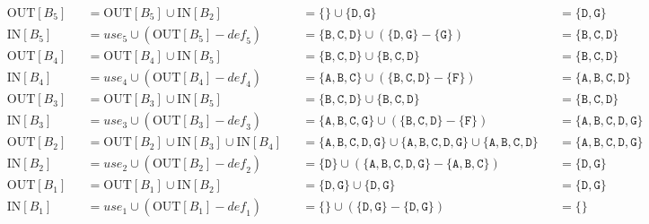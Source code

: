 \documentclass{article}
\begin{document}
\begin{align*}
    & \text{OUT}[B_5] &&= \text{OUT}[B_5] \cup \text{IN}[B_2]    &&= \{  \} \cup \{\texttt{D},\texttt{G}\} &&= \{\texttt{D},\texttt{G}\} \\
    & \text{IN}[B_5]  &&= \textit{use}_5 \cup ( \text{OUT}[B_5] - \textit{def}_5 ) &&= \{\texttt{B},\texttt{C},\texttt{D}\} \cup ( \{\texttt{D},\texttt{G}\} - \{\texttt{G}\} ) &&= \{\texttt{B},\texttt{C},\texttt{D}\} \\
    & \text{OUT}[B_4] &&= \text{OUT}[B_4] \cup \text{IN}[B_5]    &&= \{\texttt{B},\texttt{C},\texttt{D}\} \cup \{\texttt{B},\texttt{C},\texttt{D}\} &&= \{\texttt{B},\texttt{C},\texttt{D}\} \\
    & \text{IN}[B_4]  &&= \textit{use}_4 \cup ( \text{OUT}[B_4] - \textit{def}_4 ) &&= \{\texttt{A},\texttt{B},\texttt{C}\} \cup ( \{\texttt{B},\texttt{C},\texttt{D}\} - \{\texttt{F}\} ) &&= \{\texttt{A},\texttt{B},\texttt{C},\texttt{D}\} \\
    & \text{OUT}[B_3] &&= \text{OUT}[B_3] \cup \text{IN}[B_5]    &&= \{\texttt{B},\texttt{C},\texttt{D}\} \cup \{\texttt{B},\texttt{C},\texttt{D}\} &&= \{\texttt{B},\texttt{C},\texttt{D}\} \\
    & \text{IN}[B_3]  &&= \textit{use}_3 \cup ( \text{OUT}[B_3] - \textit{def}_3 ) &&= \{\texttt{A},\texttt{B},\texttt{C},\texttt{G}\} \cup ( \{\texttt{B},\texttt{C},\texttt{D}\} - \{\texttt{F}\} ) &&= \{\texttt{A},\texttt{B},\texttt{C},\texttt{D},\texttt{G}\} \\
    & \text{OUT}[B_2] &&= \text{OUT}[B_2] \cup \text{IN}[B_3] \cup \text{IN}[B_4]    &&= \{\texttt{A},\texttt{B},\texttt{C},\texttt{D},\texttt{G}\} \cup \{\texttt{A},\texttt{B},\texttt{C},\texttt{D},\texttt{G}\} \cup \{\texttt{A},\texttt{B},\texttt{C},\texttt{D}\} &&= \{\texttt{A},\texttt{B},\texttt{C},\texttt{D},\texttt{G}\} \\
    & \text{IN}[B_2]  &&= \textit{use}_2 \cup ( \text{OUT}[B_2] - \textit{def}_2 ) &&= \{\texttt{D}\} \cup ( \{\texttt{A},\texttt{B},\texttt{C},\texttt{D},\texttt{G}\} - \{\texttt{A},\texttt{B},\texttt{C}\} ) &&= \{\texttt{D},\texttt{G}\} \\
    & \text{OUT}[B_1] &&= \text{OUT}[B_1] \cup \text{IN}[B_2]    &&= \{\texttt{D},\texttt{G}\} \cup \{\texttt{D},\texttt{G}\} &&= \{\texttt{D},\texttt{G}\} \\
    & \text{IN}[B_1]  &&= \textit{use}_1 \cup ( \text{OUT}[B_1] - \textit{def}_1 ) &&= \{  \} \cup ( \{\texttt{D},\texttt{G}\} - \{\texttt{D},\texttt{G}\} ) &&= \{  \}
\end{align*}
\end{document}
